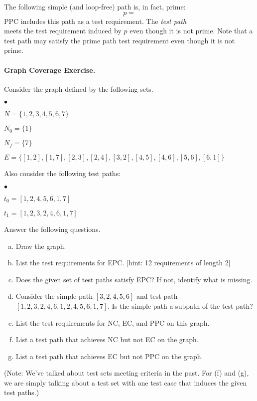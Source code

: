 \documentclass[11pt]{article}
\newcommand{\squishlist}{
 \begin{list}{$\bullet$}
  { \setlength{\itemsep}{0pt}
     \setlength{\parsep}{3pt}
     \setlength{\topsep}{3pt}
     \setlength{\partopsep}{0pt}
     \setlength{\leftmargin}{1.5em}
     \setlength{\labelwidth}{1em}
     \setlength{\labelsep}{0.5em} } }
\newcommand{\squishend}{
  \end{list}  }
\begin{document}
{\sf The following simple (and loop-free) path is, in fact, prime: }
\[ p = %
\]
PPC includes this path as a test requirement. The \emph{test path}
\[ %
\] meets the test requirement induced by $p$ even though it is not prime.
Note that a test path may satisfy the prime path test requirement even though
it is not prime.

\paragraph{Graph Coverage Exercise.} Consider the graph defined
by the following sets.
\squishlist
\item $N = \{1, 2, 3, 4, 5, 6, 7\}$
\item $N_0 = \{ 1 \}$
\item $N_f = \{ 7 \}$
\item $E = \{ [1, 2], [1, 7], [2, 3], [2,4], [3, 2], [4,5], [4, 6], [5, 6], [6, 1] \}$
  \squishend
  Also consider the following test paths:
  \squishlist
\item $t_0 = [1, 2, 4, 5, 6, 1, 7]$
\item $t_1 = [1, 2, 3, 2, 4, 6, 1, 7]$
  \squishend

Answer the following questions.
\begin{enumerate}[(a)]
\item Draw the graph.
\item List the test requirements for EPC. [hint: 12 requirements of length 2]
\item Does the given set of test paths satisfy EPC? If not, identify what is missing.
\item Consider the simple path $[3,2,4,5,6]$ and test path $[1,2,3,2,4,6,1,2,4,5,6,1,7]$. Is the simple path a subpath of the test path?
\item List the test requirements for NC, EC, and PPC on this graph.
\item List a test path that achieves NC but not EC on the graph.
\item List a test path that achieves EC but not PPC on the graph.
\end{enumerate}
(Note: We've talked about test sets meeting criteria in the past.  For
(f) and (g), we are simply talking about a test set with one test case
that induces the given test paths.)
\end{document}
